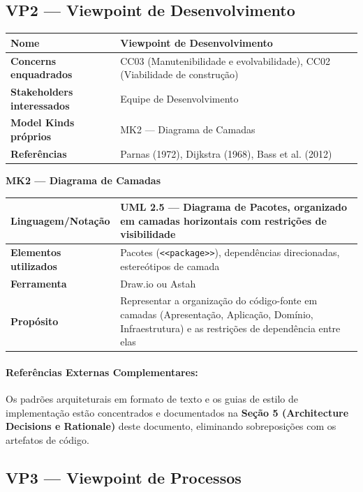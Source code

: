 \documentclass[12pt, a4paper]{article}
\begin{document}
\subsection{VP2 --- Viewpoint de Desenvolvimento}

\begin{longtable}{|p{4.5cm}|p{10cm}|}
\hline
\textbf{Nome} & Viewpoint de Desenvolvimento \\
\hline
\textbf{Concerns enquadrados} & CC03 (Manutenibilidade e evolvabilidade), CC02 (Viabilidade de construção) \\
\hline
\textbf{Stakeholders interessados} & Equipe de Desenvolvimento \\
\hline
\textbf{Model Kinds próprios} & MK2 --- Diagrama de Camadas \\
\hline
\textbf{Referências} & Parnas (1972), Dijkstra (1968), Bass et al. (2012) \\
\hline
\end{longtable}

\noindent\textbf{MK2 --- Diagrama de Camadas}
\begin{longtable}{|p{4.5cm}|p{10cm}|}
\hline
\textbf{Linguagem/Notação} & UML 2.5 --- Diagrama de Pacotes, organizado em camadas horizontais com restrições de visibilidade \\
\hline
\textbf{Elementos utilizados} & Pacotes (\texttt{<<package>>}), dependências direcionadas, estereótipos de camada \\
\hline
\textbf{Ferramenta} & Draw.io ou Astah \\
\hline
\textbf{Propósito} & Representar a organização do código-fonte em camadas (Apresentação, Aplicação, Domínio, Infraestrutura) e as restrições de dependência entre elas \\
\hline
\end{longtable}

\paragraph{Referências Externas Complementares:} Os padrões arquiteturais em formato de texto e os guias de estilo de implementação estão concentrados e documentados na \textbf{Seção 5 (Architecture Decisions e Rationale)} deste documento, eliminando sobreposições com os artefatos de código.

\subsection{VP3 --- Viewpoint de Processos}
\end{document}
